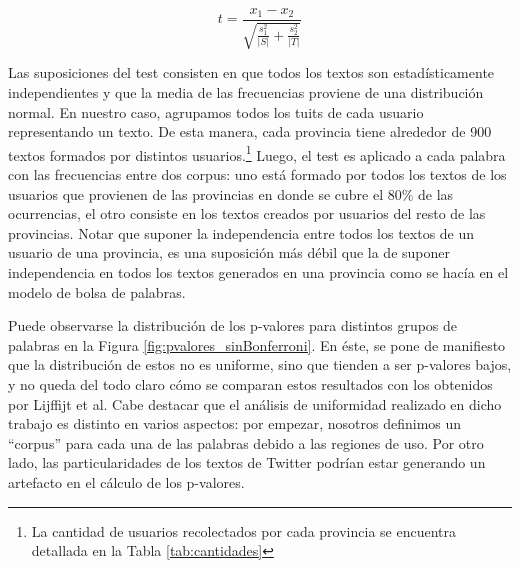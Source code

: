 \begin{equation}
\label{eq:estadistico_welch}
 t = \frac{x_1-x_2}{\sqrt{\frac{s_1^2}{\lvert S \rvert}+\frac{s_2^2}{\lvert T \rvert}}}  
\end{equation}

Las suposiciones del test consisten en que todos los textos son estadísticamente independientes y que la media de las frecuencias proviene de una distribución normal. En nuestro caso, agrupamos todos los tuits de cada usuario representando un texto. De esta manera, cada provincia tiene alrededor de 900 textos formados por distintos usuarios.\footnote{La cantidad de usuarios recolectados por cada provincia se encuentra detallada en la Tabla \ref{tab:cantidades}} Luego, el test es aplicado a cada palabra con las frecuencias entre dos corpus: uno está formado por todos los textos de los usuarios que provienen de las provincias en donde se cubre el 80\% de las ocurrencias, el otro consiste en los textos creados por usuarios del resto de las provincias. Notar que suponer la independencia entre todos los textos de un usuario de una provincia, es una suposición más débil que la de suponer independencia en todos los textos generados en una provincia como se hacía en el modelo de bolsa de palabras. 



Puede observarse la distribución de los p-valores para distintos grupos de palabras en la Figura \ref{fig:pvalores_sinBonferroni}. En éste, se pone de manifiesto que la distribución de estos no es uniforme, sino que tienden a ser p-valores bajos, y no queda del todo claro cómo se comparan estos resultados con los obtenidos por Lijffijt et al. Cabe destacar que el análisis de uniformidad realizado en dicho trabajo es distinto en varios aspectos: por empezar, nosotros definimos un ``corpus'' para cada una de las palabras debido a las regiones de uso. Por otro lado, las particularidades de los textos de Twitter podrían estar generando un artefacto en el cálculo de los p-valores.

